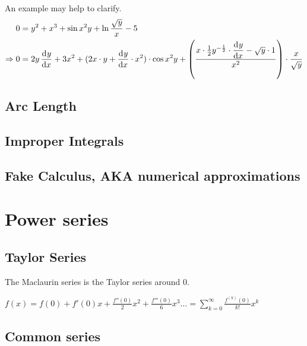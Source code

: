 \documentclass[a4paper,11pt]{article}
\begin{document}

    An example may help to clarify.
    \begin{align*}
    0 &= y^2 + x^3 + \sin x^2 y + \ln \frac{\sqrt y} x - 5 \\
    \Rightarrow 0 &=
                2y \dod yx + 3x^2 +
                (2x \cdot y + \dod yx \cdot x^2) \cdot \cos x^2 y +
                \left(\frac{x \cdot \frac 12 y^{-\frac 12} \cdot \dod yx -
                            \sqrt y \cdot 1}
                           {x^2}\right) \cdot \frac{x}{\sqrt y} \\
    \end{align*}


    \subsection{Arc Length}

    \subsection{Improper Integrals}


    \subsection{Fake Calculus, AKA numerical approximations}

    \section{Power series} %

    \subsection{Taylor Series}

    The Maclaurin series is the Taylor series around $0$.

    $\displaystyle
     f(x) = f(0) + f'(0) x + \frac{f''(0)} 2 x^2 + \frac{f'''(0)}{6}x^3 \ldots
     = \sum_{k=0}^\infty \frac{f^{(k)}(0)}{k!}x^k$

    \subsection{Common series}
\end{document}
